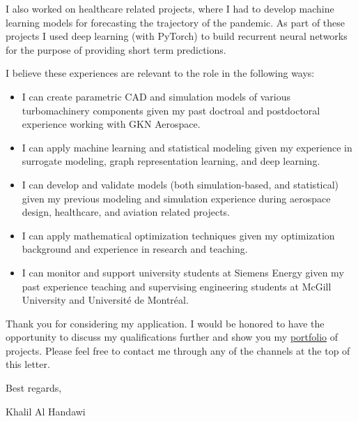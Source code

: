 \documentclass[12pt]{article} %
\begin{document}
I also worked on healthcare related projects, where I had to develop machine learning models for forecasting the trajectory of the pandemic. As part of these projects I used deep learning (with PyTorch) to build recurrent neural networks for the purpose of providing short term predictions.

\medskip %

I believe these experiences are relevant to the role in the following ways: 

\begin{itemize}
	\item I can create parametric CAD and simulation models of various turbomachinery components given my past doctroal and postdoctoral experience working with GKN Aerospace.
	\item I can apply machine learning and statistical modeling given my experience in surrogate modeling, graph representation learning, and deep learning.
	\item I can develop and validate models (both simulation-based, and statistical) given my previous modeling and simulation experience during aerospace design, healthcare, and aviation related projects.
	\item I can apply mathematical optimization techniques given my optimization background and experience in research and teaching.
	\item I can monitor and support university students at Siemens Energy given my past experience teaching and supervising engineering students at McGill University and Universit\'{e} de Montr\'{e}al.
\end{itemize}

\medskip %

Thank you for considering my application. I would be honored to have the opportunity to discuss my qualifications further and show you my \href{https://khbalhandawi.github.io/projects/}{portfolio} of projects. Please feel free to contact me through any of the channels at the top of this letter.

\medskip %

Best regards,

\medskip %


Khalil Al Handawi


\medskip %

\end{document}
